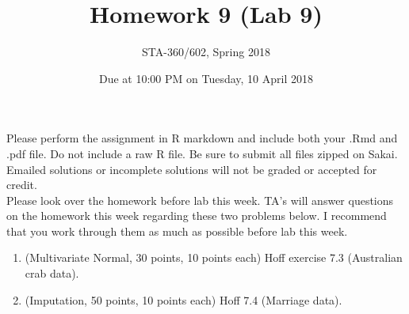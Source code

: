 \documentclass{article}
\begin{document}
\title{Homework 9 (Lab 9)}
\author{STA-360/602, Spring 2018}
\date{Due at 10:00 PM on Tuesday, 10 April 2018}
\maketitle

Please perform the assignment in R markdown and include both your
.Rmd and .pdf file. Do not include a raw R file.  Be sure to submit all files zipped
on Sakai. Emailed solutions or incomplete solutions will not be graded or accepted for credit. \\

Please look over the homework before lab this week. TA's will answer questions on the homework this week regarding these two 
problems below. I recommend that you work through them as much as possible before lab this week. 

\begin{enumerate}
\item (Multivariate Normal, 30 points, 10 points each) Hoff exercise 7.3 (Australian crab data).
\item (Imputation, 50 points, 10 points each) Hoff 7.4 (Marriage data).
\end{enumerate}
\end{document}
